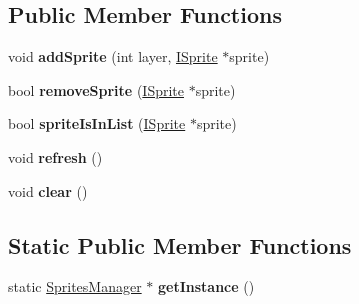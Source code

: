 \subsection*{Public Member Functions}
\begin{DoxyCompactItemize}
\item 
void {\bfseries add\+Sprite} (int layer, \hyperlink{class_otter_engine_1_1_i_sprite}{I\+Sprite} $\ast$sprite)\hypertarget{class_otter_engine_1_1_sprites_manager_ad9a4393b6b14d13ca174005f62bc7dfe}{}\label{class_otter_engine_1_1_sprites_manager_ad9a4393b6b14d13ca174005f62bc7dfe}

\item 
bool {\bfseries remove\+Sprite} (\hyperlink{class_otter_engine_1_1_i_sprite}{I\+Sprite} $\ast$sprite)\hypertarget{class_otter_engine_1_1_sprites_manager_a244103622ab8aaee494df6c4a99fd6f4}{}\label{class_otter_engine_1_1_sprites_manager_a244103622ab8aaee494df6c4a99fd6f4}

\item 
bool {\bfseries sprite\+Is\+In\+List} (\hyperlink{class_otter_engine_1_1_i_sprite}{I\+Sprite} $\ast$sprite)\hypertarget{class_otter_engine_1_1_sprites_manager_ac0462a48b7a483c44b28f55d3128be71}{}\label{class_otter_engine_1_1_sprites_manager_ac0462a48b7a483c44b28f55d3128be71}

\item 
void {\bfseries refresh} ()\hypertarget{class_otter_engine_1_1_sprites_manager_a5f5b61df970636214e99b4c3d6944fd2}{}\label{class_otter_engine_1_1_sprites_manager_a5f5b61df970636214e99b4c3d6944fd2}

\item 
void {\bfseries clear} ()\hypertarget{class_otter_engine_1_1_sprites_manager_a1a9c8eaafbfec2ea4f572b02b5105212}{}\label{class_otter_engine_1_1_sprites_manager_a1a9c8eaafbfec2ea4f572b02b5105212}

\end{DoxyCompactItemize}
\subsection*{Static Public Member Functions}
\begin{DoxyCompactItemize}
\item 
static \hyperlink{class_otter_engine_1_1_sprites_manager}{Sprites\+Manager} $\ast$ {\bfseries get\+Instance} ()\hypertarget{class_otter_engine_1_1_sprites_manager_a40713654364c2fddc4d45913a252e95a}{}\label{class_otter_engine_1_1_sprites_manager_a40713654364c2fddc4d45913a252e95a}

\end{DoxyCompactItemize}
